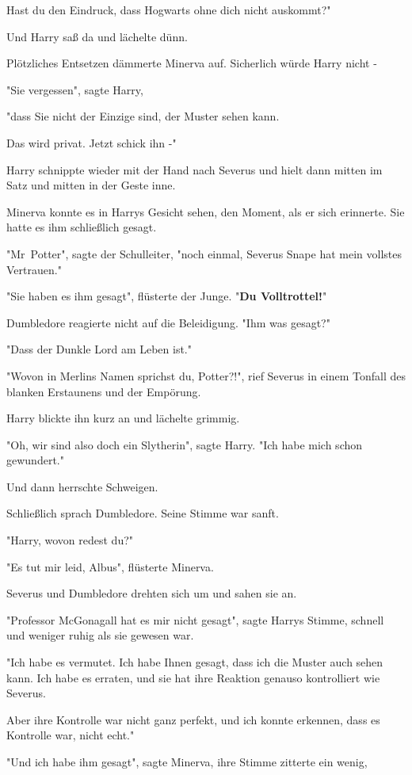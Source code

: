 {Hast du den Eindruck, dass Hogwarts ohne dich nicht auskommt?"

Und Harry saß da und lächelte dünn.

Plötzliches Entsetzen dämmerte Minerva auf. Sicherlich würde Harry nicht -

"Sie vergessen", sagte Harry,

"dass Sie nicht der Einzige sind, der Muster sehen kann.

Das wird privat. Jetzt schick ihn -"

Harry schnippte wieder mit der Hand nach Severus und hielt dann mitten im Satz und mitten in der Geste inne.

Minerva konnte es in Harrys Gesicht sehen, den Moment, als er sich erinnerte. Sie hatte es ihm schließlich gesagt.

"Mr~Potter", sagte der Schulleiter, "noch einmal, Severus Snape hat mein vollstes Vertrauen."

"Sie haben es ihm gesagt", flüsterte der Junge. "\textbf{Du Volltrottel!}"

Dumbledore reagierte nicht auf die Beleidigung. "Ihm was gesagt?"

"Dass der Dunkle Lord am Leben ist."

"Wovon in Merlins Namen sprichst du, Potter?!", rief Severus in einem Tonfall des blanken Erstaunens und der Empörung.

Harry blickte ihn kurz an und lächelte grimmig.

"Oh, wir sind also doch ein Slytherin", sagte Harry. "Ich habe mich schon gewundert."

Und dann herrschte Schweigen.

Schließlich sprach Dumbledore. Seine Stimme war sanft.

"Harry, wovon redest du?"

"Es tut mir leid, Albus", flüsterte Minerva.

Severus und Dumbledore drehten sich um und sahen sie an.

"Professor McGonagall hat es mir nicht gesagt", sagte Harrys Stimme, schnell und weniger ruhig als sie gewesen war.

"Ich habe es vermutet. Ich habe Ihnen gesagt, dass ich die Muster auch sehen kann. Ich habe es erraten, und sie hat ihre Reaktion genauso kontrolliert wie Severus.

Aber ihre Kontrolle war nicht ganz perfekt, und ich konnte erkennen, dass es Kontrolle war, nicht echt."

"Und ich habe ihm gesagt", sagte Minerva, ihre Stimme zitterte ein wenig,

}
